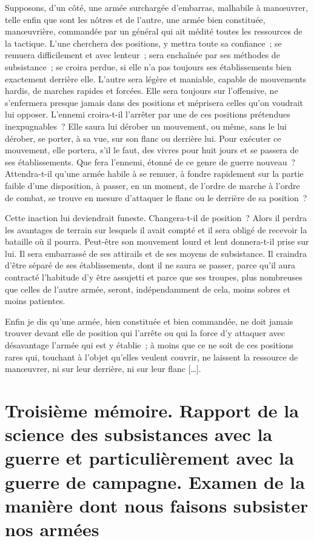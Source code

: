 \documentclass[french,twoside]{book} %
\begin{document}
Supposons, d’un côté, une armée surchargée d’embarras, malhabile à manœuvrer, telle enfin que sont les nôtres et de l’autre, une armée bien constituée, manœuvrière, commandée par un général qui ait médité toutes les ressources de la tactique. L’une cherchera des positions, y mettra toute sa confiance ; se remuera difficilement et avec lenteur ; sera enchaînée par ses méthodes de subsistance ; se croira perdue, si elle n’a pas toujours ses établissements bien exactement derrière elle. L’autre sera légère et maniable, capable de mouvements hardis, de marches rapides et forcées. Elle sera toujours sur l’offensive, ne s’enfermera presque jamais dans des positions et méprisera celles qu’on voudrait lui opposer. L’ennemi croira-t-il l’arrêter par une de ces positions prétendues inexpugnables ? Elle saura lui dérober un mouvement, ou même, sans le lui dérober, se porter, à sa vue, sur son flanc ou derrière lui. Pour exécuter ce mouvement, elle portera, s’il le faut, des vivres pour huit jours et se passera de ses établissements. Que fera l’ennemi, étonné de ce genre de guerre nouveau ? Attendra-t-il qu’une armée habile à se remuer, à fondre rapidement sur la partie faible d’une disposition, à passer, en un moment, de l’ordre de marche à l’ordre de combat, se trouve en mesure d’attaquer le flanc ou le derrière de sa position ?\par
Cette inaction lui deviendrait funeste. Changera-t-il de position ? Alors il perdra les avantages de terrain sur lesquels il avait compté et il sera obligé de recevoir la bataille où il pourra. Peut-être son mouvement lourd et lent donnera-t-il prise sur lui. Il sera embarrassé de ses attirails et de ses moyens de subsistance. Il craindra d’être séparé de ses établissements, dont il ne saura se passer, parce qu’il aura contracté l’habitude d’y être assujetti et parce que ses troupes, plus nombreuses que celles de l’autre armée, seront, indépendamment de cela, moins sobres et moins patientes.\par
Enfin je dis qu’une armée, bien constituée et bien commandée, ne doit jamais trouver devant elle de position qui l’arrête ou qui la force d’y attaquer avec désavantage l’armée qui est y établie ; à moins que ce ne soit de ces positions rares qui, touchant à l’objet qu’elles veulent couvrir, ne laissent la ressource de manœuvrer, ni sur leur derrière, ni sur leur flanc […].
\section[{Troisième mémoire. Rapport de la science des subsistances avec la guerre et particulièrement avec la guerre de campagne. Examen de la manière dont nous faisons subsister nos armées}]{Troisième mémoire. Rapport de la science des subsistances avec la guerre et particulièrement avec la guerre de campagne. Examen de la manière dont nous faisons subsister nos armées}\renewcommand{\leftmark}{Troisième mémoire. Rapport de la science des subsistances avec la guerre et particulièrement avec la guerre de campagne. Examen de la manière dont nous faisons subsister nos armées}
\end{document}
